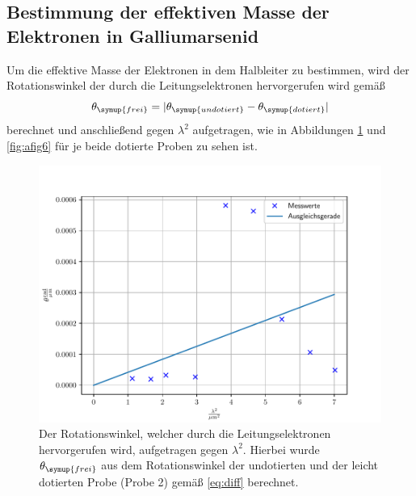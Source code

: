 \subsection{Bestimmung der effektiven Masse der Elektronen in Galliumarsenid}
Um die effektive Masse der Elektronen in dem Halbleiter zu bestimmen, wird der Rotationswinkel der durch die Leitungselektronen hervorgerufen wird gemäß
\begin{equation}
    \theta_{\symup{frei}} = |\theta_{\symup{undotiert}}-\theta_{\symup{dotiert}}| \label{eq:diff}
\end{equation}
berechnet und anschließend gegen $\lambda^2$ aufgetragen, wie in Abbildungen \ref{fig:afig5} und \ref{fig:afig6} für je beide dotierte Proben zu sehen ist. 

\noindent
\FloatBarrier
\begin{figure}[h]
    \centering
    \includegraphics[width=1\textwidth]{Winkel_frei1.pdf}
    \caption{Der Rotationswinkel, welcher durch die Leitungselektronen hervorgerufen wird, aufgetragen gegen $\lambda^2$. Hierbei wurde $\theta_{\symup{frei}}$ aus dem Rotationswinkel der undotierten und der leicht dotierten Probe (Probe 2) gemäß \ref{eq:diff} berechnet.}
    \label{fig:afig5}
\end{figure}
\FloatBarrier
\noindent
\noindent
\FloatBarrier
